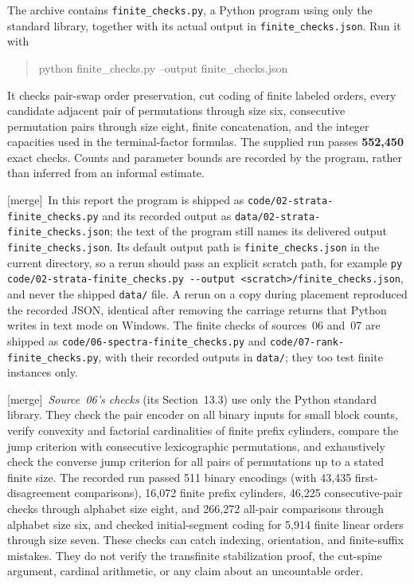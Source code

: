 \documentclass[11pt,a4paper]{article}
\theoremstyle{definition}
\theoremstyle{remark}
\newcommand{\merge}{\textsf{[merge]}}
\begin{document}
The archive contains \texttt{finite\_checks.py}, a Python program using only
the standard library, together with its actual output in
\texttt{finite\_checks.json}. Run it with
\begin{quote}\ttfamily
python finite\_checks.py --output finite\_checks.json
\end{quote}
It checks pair-swap order preservation, cut coding of finite labeled
orders, every candidate adjacent pair of permutations through size six,
consecutive permutation pairs through size eight, finite concatenation,
and the integer capacities used in the terminal-factor formulas. The supplied run passes \textbf{552,450} exact checks. Counts
and parameter bounds are recorded by the program, rather than inferred
from an informal estimate.

\merge\ In this report the program is shipped as
\nolinkurl{code/02-strata-finite_checks.py} and its recorded output as
\nolinkurl{data/02-strata-finite_checks.json}; the text of the program still
names its delivered output \texttt{finite\_checks.json}. Its default output
path is \texttt{finite\_checks.json} in the current directory, so a rerun
should pass an explicit scratch path, for example
\nolinkurl{py code/02-strata-finite_checks.py --output <scratch>/finite_checks.json},
and never the shipped \texttt{data/} file. A rerun on a copy during placement
reproduced the recorded JSON, identical after removing the carriage returns
that Python writes in text mode on Windows. The finite checks of sources~06 and~07
are shipped as \nolinkurl{code/06-spectra-finite_checks.py} and
\nolinkurl{code/07-rank-finite_checks.py}, with their recorded outputs in
\texttt{data/}; they too test finite instances only.

\merge\ \emph{Source~06's checks} (its Section~13.3) use only the Python standard
library. They check the pair encoder on all binary inputs for small block
counts, verify convexity and factorial cardinalities of finite prefix
cylinders, compare the jump criterion with consecutive lexicographic
permutations, and exhaustively check the converse jump criterion for all
pairs of permutations up to a stated finite size. The recorded run passed 511
binary encodings (with 43,435 first-disagreement comparisons), 16,072 finite
prefix cylinders, 46,225 consecutive-pair checks through alphabet size eight,
and 266,272 all-pair comparisons through alphabet size six, and checked
initial-segment coding for 5,914 finite linear orders through size seven. These
checks can catch indexing, orientation, and finite-suffix mistakes. They do
not verify the transfinite stabilization proof, the cut-spine argument,
cardinal arithmetic, or any claim about an uncountable order.
\end{document}
